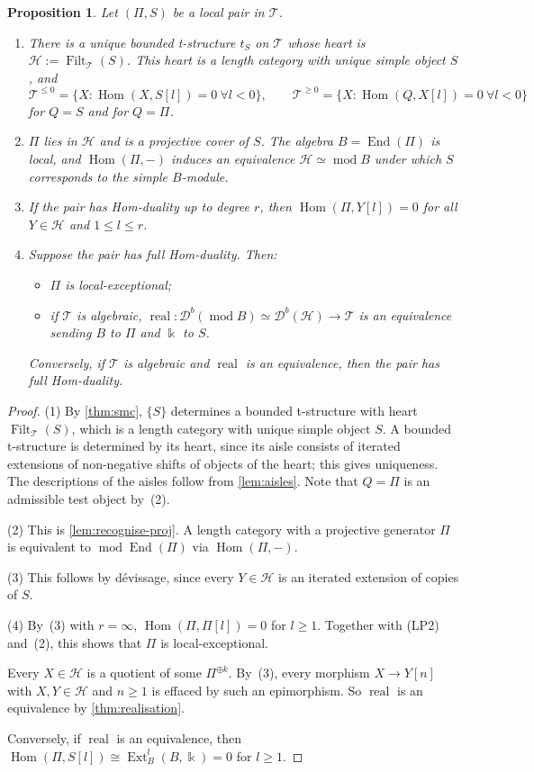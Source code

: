 \documentclass[11pt,reqno]{amsart}
\theoremstyle{plain}
\newtheorem{proposition}[theorem]{Proposition}
\theoremstyle{definition}
\theoremstyle{remark}
\newcommand{\kk}{\Bbbk}
\DeclareMathOperator{\Hom}{Hom}
\DeclareMathOperator{\End}{End}
\DeclareMathOperator{\Ext}{Ext}
\DeclareMathOperator{\Filt}{Filt}
\DeclareMathOperator{\real}{real}
\newcommand{\modd}{\operatorname{mod}}
\newcommand{\Db}{\mathcal{D}^b}
\newcommand{\cH}{\mathcal{H}}
\newcommand{\cT}{\mathcal{T}}
\begin{document}
\begin{proposition}\label{prop:local-pair}
Let $(\Pi,S)$ be a local pair in $\cT$.
\begin{enumerate}
\item There is a unique bounded t-structure $t_S$ on $\cT$ whose heart is $\cH:=\Filt_\cT(S)$. This heart is a length category with unique simple object $S$, and
\[\cT^{\le0}=\{X:\Hom(X,S[l])=0\ \forall l<0\},\qquad \cT^{\ge0}=\{X:\Hom(Q,X[l])=0\ \forall l<0\}\]
for $Q=S$ and for $Q=\Pi$.
\item $\Pi$ lies in $\cH$ and is a projective cover of $S$. The algebra $B=\End(\Pi)$ is local, and $\Hom(\Pi,-)$ induces an equivalence $\cH\simeq\modd B$ under which $S$ corresponds to the simple $B$-module.
\item If the pair has Hom-duality up to degree $r$, then $\Hom(\Pi,Y[l])=0$ for all $Y\in\cH$ and $1\le l\le r$.
\item Suppose the pair has full Hom-duality. Then:
\begin{itemize}
\item $\Pi$ is local-exceptional;
\item if $\cT$ is algebraic, $\real\colon\Db(\modd B)\simeq\Db(\cH)\to\cT$ is an equivalence sending $B$ to $\Pi$ and $\kk$ to $S$.
\end{itemize}
Conversely, if $\cT$ is algebraic and $\real$ is an equivalence, then the pair has full Hom-duality.
\end{enumerate}
\end{proposition}

\begin{proof}
(1) By \cref{thm:smc}, $\{S\}$ determines a bounded t-structure with heart $\Filt_\cT(S)$, which is a length category with unique simple object $S$. A bounded t-structure is determined by its heart, since its aisle consists of iterated extensions of non-negative shifts of objects of the heart; this gives uniqueness. The descriptions of the aisles follow from \cref{lem:aisles}. Note that $Q=\Pi$ is an admissible test object by~(2).

(2) This is \cref{lem:recognise-proj}. A length category with a projective generator $\Pi$ is equivalent to $\modd\End(\Pi)$ via $\Hom(\Pi,-)$.

(3) This follows by d\'evissage, since every $Y\in\cH$ is an iterated extension of copies of $S$.

(4) By~(3) with $r=\infty$, $\Hom(\Pi,\Pi[l])=0$ for $l\ge1$. Together with (LP2) and~(2), this shows that $\Pi$ is local-exceptional.

Every $X\in\cH$ is a quotient of some $\Pi^{\oplus k}$. By~(3), every morphism $X\to Y[n]$ with $X,Y\in\cH$ and $n\ge1$ is effaced by such an epimorphism. So $\real$ is an equivalence by \cref{thm:realisation}.

Conversely, if $\real$ is an equivalence, then $\Hom(\Pi,S[l])\cong\Ext^l_B(B,\kk)=0$ for $l\ge1$.
\end{proof}
\end{document}

